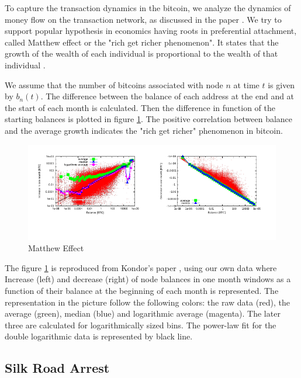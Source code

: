 To capture the transaction  dynamics in the bitcoin, we analyze the dynamics of money flow on the transaction network, as discussed in the paper \citep{Csabai2014}. We try to support popular hypothesis in economics having roots in preferential attachment, called Matthew effect or the "rich get richer phenomenon". It states that the growth of the wealth of each individual is proportional to the wealth of that individual \citep{Csabai2014}.

We assume that the number of bitcoins associated with node $n$ at time $t$ is given by $b_{n}(t)$. The difference between the balance of each
address at the end and at the start of each month is calculated. Then the difference in function of the starting balances is plotted in figure \ref{fig:dynamics}. The  positive correlation between balance and the average growth indicates the "rich get richer" phenomenon in bitcoin.

\begin{figure}[ht]
\begin{center}
\includegraphics[width= \textwidth]{./Figures/dynamics.png}
\caption{ Matthew Effect}
\label{fig:dynamics}
\end{center}
\end{figure}

The figure \ref{fig:dynamics} is reproduced from Kondor's paper \citep{Csabai2014}, using our own data where Increase (left) and decrease (right) of node balances in one month windows as a function of their balance at the beginning of each month is represented. The representation in the picture follow the following colors: the raw data (red), the average (green), median (blue) and logarithmic average (magenta). The later three are calculated for logarithmically sized bins. The power-law fit for the double logarithmic data is represented by black line.

\subsection{Silk Road Arrest}

